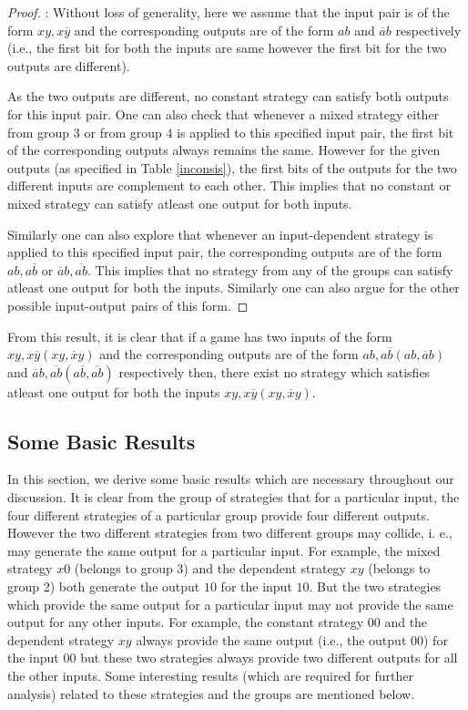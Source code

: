 \documentclass[]{svjour3}
\begin{document}
\begin{proof}
	: Without loss of generality, here we assume that the input pair is of the form $xy, x\overline{y}$ and the corresponding outputs are of the form $ab$ and $\overline{a}b$ respectively (i.e., the first bit for both the inputs are same however the first bit for the two outputs are different). 
	
	As the two outputs are different, no constant strategy can satisfy both outputs for this input pair. One can also check that whenever a mixed strategy either from group $3$ or from group $4$ is applied to this specified input pair, the first bit of the corresponding outputs always remains the same. However for the given outputs (as specified in Table \ref{inconsis}), the first bits of the outputs for the two different inputs are complement to each other. This implies that no constant or mixed strategy can satisfy atleast one output for both inputs. 
	
	Similarly one can also explore that whenever an input-dependent strategy is applied to this specified input pair, the corresponding outputs are of the form $ab, a\overline{b}$ or $\overline{a}b, \overline{ab}$. This implies that no strategy from any of the groups can satisfy atleast one output for both the inputs. Similarly one can also argue for the other possible input-output pairs of this form. 
\end{proof}
\noindent

From this result, it is clear that if a game has two inputs of the form $xy, x\overline{y} (xy, \overline{x}y)$ and the corresponding outputs are of the form $ab, a\overline{b} (ab, \overline{a}b)$ and $\overline{a}b, \overline{ab} (a\overline{b}, \overline{ab})$ respectively then, there exist no strategy which satisfies atleast one output for both the inputs $xy, x\overline{y} (xy, \overline{x}y)$.

\subsection{Some Basic Results}
\label{bascresult}

In this section, we derive some basic results which are necessary throughout our discussion. It is clear from the group of strategies that for a particular input, the four different strategies of a particular group provide four different outputs. However the two different strategies from two different groups may collide, i. e., may generate the same output for a particular input. For example, the mixed strategy $x0$ (belongs to group 3) and the dependent strategy $xy$ (belongs to group 2) both generate the output $10$ for the input $10$. But the two strategies which provide the same output for a particular input may not provide the same output for any other inputs. For example, the constant strategy $00$ and the dependent strategy $xy$ always provide the same output (i.e., the output $00$) for the input $00$ but these two strategies always provide two different outputs for all the other inputs. Some interesting results (which are required for further analysis) related to these strategies and the groups are mentioned below.\\
\end{document}
